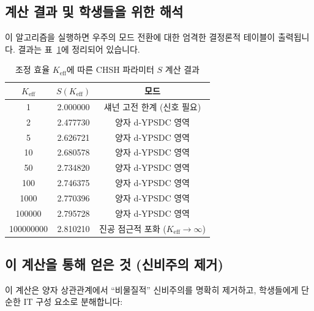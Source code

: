\documentclass[12pt,a4paper]{article}
\begin{document}
	\subsection{계산 결과 및 학생들을 위한 해석}
	
	이 알고리즘을 실행하면 우주의 모드 전환에 대한 엄격한 결정론적 테이블이 출력됩니다. 결과는 표~\ref{tab:bell_yuct}에 정리되어 있습니다.
	
	\begin{table}[htbp]
		\centering
		\small
		\setlength{\tabcolsep}{4pt}
		\caption{조정 효율 \(K_{\mathrm{eff}}\)에 따른 CHSH 파라미터 \(S\) 계산 결과}
		\label{tab:bell_yuct}
		\begin{tabular}{ccc}
			\toprule
			\(K_{\mathrm{eff}}\) & \(S(K_{\mathrm{eff}})\) & 모드 \\
			\midrule
			1            & 2.000000 & 섀넌 고전 한계 (신호 필요) \\
			2            & 2.477730 & 양자 d‑YPSDC 영역 \\
			5            & 2.626721 & 양자 d‑YPSDC 영역 \\
			10           & 2.680578 & 양자 d‑YPSDC 영역 \\
			50           & 2.734820 & 양자 d‑YPSDC 영역 \\
			100          & 2.746375 & 양자 d‑YPSDC 영역 \\
			1000         & 2.770396 & 양자 d‑YPSDC 영역 \\
			100000       & 2.795728 & 양자 d‑YPSDC 영역 \\
			100000000    & 2.810210 & 진공 점근적 포화 (\(K_{\mathrm{eff}} \to \infty\)) \\
			\bottomrule
		\end{tabular}
	\end{table}
	
	\subsection{이 계산을 통해 얻은 것 (신비주의 제거)}
	
	이 계산은 양자 상관관계에서 “비물질적” 신비주의를 명확히 제거하고, 학생들에게 단순한 IT 구성 요소로 분해합니다:
	
\end{document}
